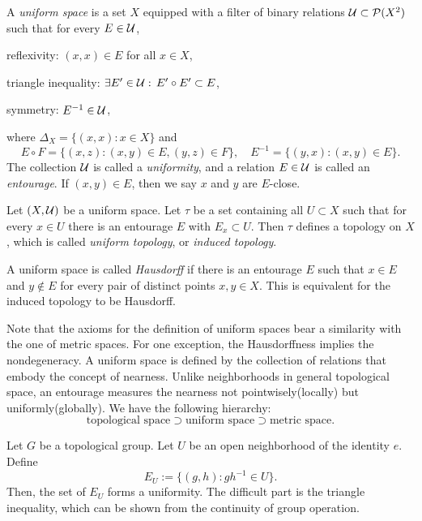 \begin{defn}
A \emph{uniform space} is a set $X$ equipped with a filter of binary relations $\mathcal{U}\subset\mathcal{P}(X^2)$ such that for every $E\in\mathcal{U}$,
\begin{cond}
\item reflexivity: $(x,x)\in E$ for all $x\in X$,
\item triangle inequality: $\exists E'\in\mathcal{U}:\,E'\circ E'\subset E$,
\item symmetry: $E^{-1}\in\mathcal{U}$,
\end{cond}
where $\Delta_X=\{(x,x):x\in X\}$ and
\[E\circ F=\{(x,z):(x,y)\in E,(y,z)\in F\},\quad E^{-1}=\{(y,x):(x,y)\in E\}.\]
The collection $\mathcal{U}$ is called a \emph{uniformity}, and a relation $E\in\mathcal{U}$ is called an \emph{entourage}.
If $(x,y)\in E$, then we say $x$ and $y$ are $E$-close.
\end{defn}
\begin{defn}
Let $(X,\mathcal{U})$ be a uniform space.
Let $\tau$ be a set containing all $U\subset X$ such that for every $x\in U$ there is an entourage $E$ with $E_x\subset U$.
Then $\tau$ defines a topology on $X$, which is called \emph{uniform topology}, or \emph{induced topology}.
\end{defn}
\begin{defn}
A uniform space is called \emph{Hausdorff} if there is an entourage $E$ such that $x\in E$ and $y\notin E$ for every pair of distinct points $x,y\in X$.
This is equivalent for the induced topology to be Hausdorff.
\end{defn}

Note that the axioms for the definition of uniform spaces bear a similarity with the one of metric spaces.
For one exception, the Hausdorffness implies the nondegeneracy.
A uniform space is defined by the collection of relations that embody the concept of nearness.
Unlike neighborhoods in general topological space, an entourage measures the nearness not pointwisely(locally) but uniformly(globally).
We have the following hierarchy:
\[\text{topological space} \supset \text{uniform space} \supset \text{metric space}.\]
\begin{ex}
Let $G$ be a topological group.
Let $U$ be an open neighborhood of the identity $e$.
Define
\[E_U:=\{(g,h):gh^{-1}\in U\}.\]
Then, the set of $E_U$ forms a uniformity.
The difficult part is the triangle inequality, which can be shown from the continuity of group operation.
\end{ex}




